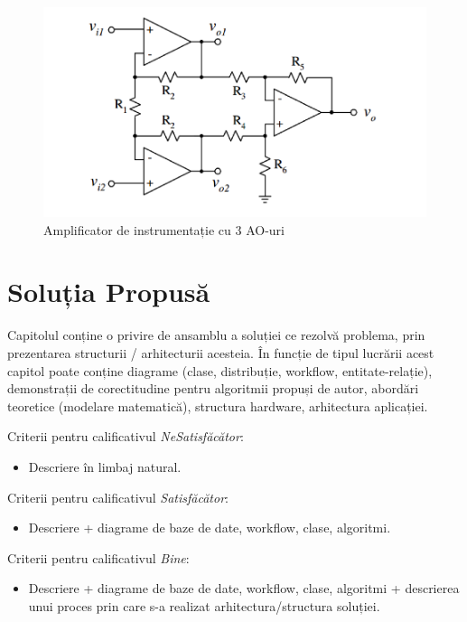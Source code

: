 \documentclass[12pt,a4paper]{report}
\begin{document}
\newpage

\begin{figure}[th]
\centering
\includegraphics{pics/Pic2.png}
  \caption[Amplificator de instrumentație cu 3 AO-uri]{Amplificator de instrumentație cu 3 AO-uri\protect\footnotemark}
  \label{fig:pic2}
\end{figure}

\chapter{Soluția Propusă}
Capitolul conține o privire de ansamblu a soluției ce rezolvă problema, prin prezentarea structurii / arhitecturii acesteia. În funcție de tipul lucrării acest capitol poate conține diagrame (clase, distribuție, workflow, entitate-relație), demonstrații de corectitudine pentru algoritmii propuși de autor, abordări teoretice (modelare matematică), structura hardware, arhitectura aplicației.


Criterii pentru calificativul \textit{Ne\textit{Satisfăcător}}: 
\begin{itemize}
	\item	Descriere în limbaj natural.
\end{itemize}

Criterii pentru calificativul \textit{Satisfăcător}: 
\begin{itemize}
	\item	Descriere + diagrame de baze de date, workflow, clase, algoritmi. 
\end{itemize}

Criterii pentru calificativul \textit{Bine}: 
\begin{itemize}
	\item 	Descriere + diagrame de baze de date, workflow, clase, algoritmi + descrierea unui proces prin care s-a realizat arhitectura/structura soluției.
\end{itemize}
\end{document}

